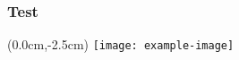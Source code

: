 \documentclass{beamer}
\begin{document}
\begin{frame}
\frametitle{Test}
  \begin{textblock*}{\textwidth}(0.0cm,-2.5cm)
   \texttt{[image: example-image]}
  \end{textblock*}
\end{frame}
\end{document}
